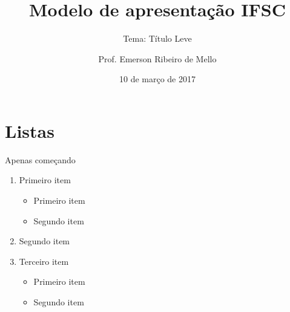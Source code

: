 \documentclass{beamer}
\title{Modelo de apresentação IFSC}
\subtitle{Tema: Título Leve}
\author{Prof. Emerson Ribeiro de Mello}
\date{10 de março de 2017}
\institute{\url{mello@ifsc.edu.br}}
\let\olditem\item
\renewcommand{\item}{%
\olditem\vspace{\fill}}
\begin{document}
\begin{frame}[t]
	\maketitle
\end{frame}

\section{Listas}

\begin{frame}{Apenas começando}
	\begin{enumerate}
		\item Primeiro item
		\begin{itemize}
			\item Primeiro item
			\item Segundo item
		\end{itemize}
		\item Segundo item
		\item Terceiro item 
		\begin{itemize}
			\item Primeiro item
			\item Segundo item
		\end{itemize}
	\end{enumerate}
\end{frame}
\end{document}
